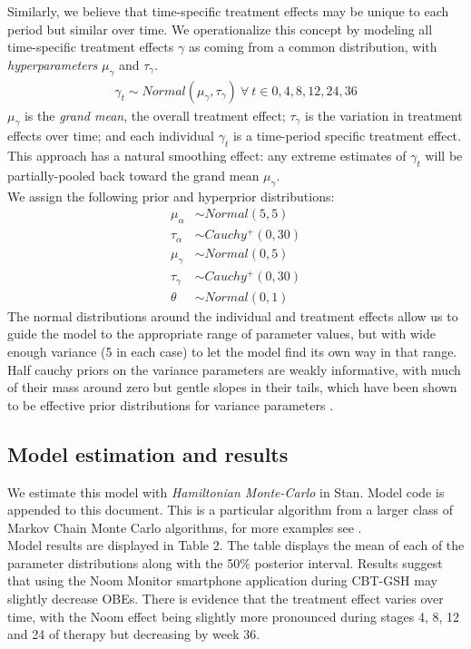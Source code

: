\documentclass{article}
\begin{document}
%
Similarly, we believe that time-specific treatment effects may be unique to each period but similar over time. We operationalize this concept by modeling all time-specific treatment effects $\gamma$ as coming from a common distribution, with \emph{hyperparameters} $\mu_{\gamma}$ and $\tau_{\gamma}$.
%
\begin{align}
\gamma_t \sim Normal(\mu_{\gamma}, \tau_{\gamma}) \ \forall \ t \in 0, 4, 8, 12, 24, 36
\end{align} 
%
$\mu_{\gamma}$ is the \emph{grand mean}, the overall treatment effect; $\tau_{\gamma}$ is the variation in treatment effects over time; and each individual $\gamma_t$ is a time-period specific treatment effect.  This approach has a natural smoothing effect: any extreme estimates of $\gamma_t$ will be partially-pooled back toward the grand mean $\mu_{\gamma}$.\\
%
We assign the following prior and hyperprior distributions:
\begin{align}
\mu_{\alpha} &\sim Normal(5, 5) \\
\tau_{\alpha} &\sim Cauchy^+(0, 30) \\
\mu_{\gamma} &\sim Normal(0, 5) \\
\tau_{\gamma} &\sim Cauchy^+(0, 30) \\
\theta &\sim Normal(0, 1)
\end{align}
%
The normal distributions around the individual and treatment effects allow us to guide the model to the appropriate range of parameter values, but with wide enough variance (5 in each case) to let the model find its own way in that range.  Half cauchy priors on the variance parameters are weakly informative, with much of their mass around zero but gentle slopes in their tails, which have been shown to be effective prior distributions for variance parameters \cite{gelman2006prior}.

\subsection{Model estimation and results}
We estimate this model with \emph{Hamiltonian Monte-Carlo} in Stan.  Model code is appended to this document. This is a particular algorithm from a larger class of Markov Chain Monte Carlo algorithms, for more examples see .\\
Model results are displayed in Table 2. The table displays the mean of each of the parameter distributions along with the 50\% posterior interval. Results suggest that using the Noom Monitor smartphone application during CBT-GSH may slightly decrease OBEs.  There is evidence that the treatment effect varies over time, with the Noom effect being slightly more pronounced during stages 4, 8, 12 and 24 of therapy but decreasing by week 36.\\
\end{document}
